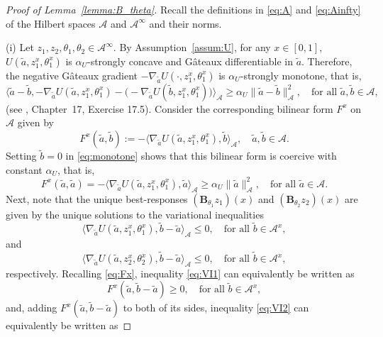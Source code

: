 \documentclass[11pt]{article}
\newcommand{\be}{\begin{equation}}
\newcommand{\ee}{\end{equation}}
\numberwithin{equation}{section}
\begin{document}
\begin{proof}[Proof of Lemma~\ref{lemma:B_theta}] Recall the definitions in \eqref{eq:A} and \eqref{eq:Ainfty} of the Hilbert spaces $\mathcal{A}$ and $\mathcal{A}^\infty$ and their norms.  

(i) Let $z_1,z_2, \theta_1,\theta_2\in\mathcal{A}^\infty$. By Assumption~\ref{assum:U}, for any $x\in[0,1]$, $U(\tilde{a},z_1^x,\theta_1^x)$ is $\alpha_U$-strongly concave and G\^ateaux differentiable in $\tilde{a}$. Therefore, the negative G\^ateaux gradient $-\nabla_{\tilde a}U(\cdot,z_1^x,\theta_1^x)$ is $\alpha_U$-strongly monotone, that is, 
\be\label{eq:monotone}
\big \langle \tilde{a}-\tilde{b}, -\nabla_{\tilde a}U(\tilde{a},z_1^x,\theta_1^x)-\big(-\nabla_{\tilde a}U(\tilde{b},z_1^x,\theta_1^x)\big)\big\rangle_\mathcal{A}\geq \alpha_U\|\tilde a-\tilde b \|_{\mathcal{A}}^2,\quad \textrm{for all }\tilde{a},\tilde{b}\in\mathcal{A},
\ee
(see \cite{bauschke2017}, Chapter~17, Exercise 17.5). Consider the corresponding bilinear form $F^x$ on $\mathcal{A}$ given by 
\be\label{eq:Fx}
F^x(\tilde a,\tilde b):= -\langle \nabla_{\tilde a}U(\tilde{a},z_1^x,\theta_1^x), \tilde{b}\rangle_{\mathcal{A}},\quad \tilde{a},\tilde{b}\in\mathcal{A}.
\ee
Setting $\tilde b=0$ in \eqref{eq:monotone} shows that this bilinear form is coercive with constant $\alpha_U$, that is,
\be
F^x(\tilde a,\tilde a)=-\langle \nabla_{\tilde a}U(\tilde{a},z_1^x,\theta_1^x), \tilde{a}\rangle_\mathcal{A}\geq \alpha_U \|\tilde{a}\|^2_\mathcal{A},\quad \textrm{for all }\tilde{a}\in\mathcal{A}.
\ee
Next, note that the unique best-responses $(\boldsymbol{B}_{\theta_1}z_1)(x)$ and $(\boldsymbol{B}_{\theta_2}z_2)(x)$ are given by the unique solutions to the variational inequalities
\be\label{eq:VI1}
\langle \nabla_{\tilde a}U(\tilde{a},z_1^x,\theta_1^x), \tilde{b}- \tilde{a}\rangle_\mathcal{A}\leq 0, \quad  \textrm{for all } \tilde{b}\in\mathcal{A}^x,
\ee
and 
\be\label{eq:VI2}
\langle \nabla_{\tilde a}U(\tilde{a},z_2^x,\theta_2^x), \tilde{b}- \tilde{a}\rangle_\mathcal{A}\leq 0, \quad  \textrm{for all } \tilde{b}\in\mathcal{A}^x,
\ee
respectively. Recalling \eqref{eq:Fx}, inequality \eqref{eq:VI1} can equivalently be written as 
\be\label{eq:VI1-rewritten}
F^x(\tilde a,\tilde b-\tilde a)\geq 0, \quad  \textrm{for all } \tilde{b}\in\mathcal{A}^x,
\ee
and, adding $F^x(\tilde a,\tilde b-\tilde a)$ to both of its sides, inequality \eqref{eq:VI2} can equivalently be written as 


\end{proof}
\end{document}
